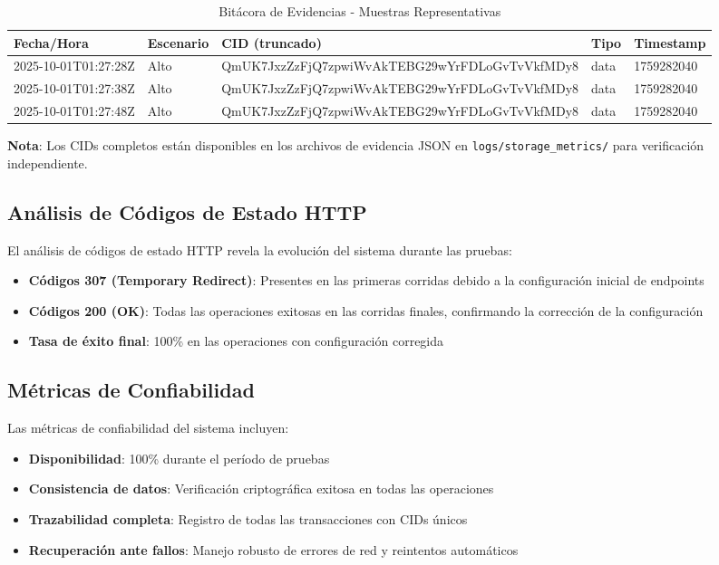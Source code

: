 \documentclass[onecolumn]{article}
\begin{document}
\begin{table}[H]
\centering
\caption{Bitácora de Evidencias - Muestras Representativas}
\begin{tabular}{@{}llp{3cm}ll@{}}
\toprule
\textbf{Fecha/Hora} & \textbf{Escenario} & \textbf{CID (truncado)} & \textbf{Tipo} & \textbf{Timestamp} \\
\midrule
2025-10-01T01:27:28Z & Alto & QmUK7JxzZzFjQ7zpwiWvAkTEBG29wYrFDLoGvTvVkfMDy8 & data & 1759282040 \\
2025-10-01T01:27:38Z & Alto & QmUK7JxzZzFjQ7zpwiWvAkTEBG29wYrFDLoGvTvVkfMDy8 & data & 1759282040 \\
2025-10-01T01:27:48Z & Alto & QmUK7JxzZzFjQ7zpwiWvAkTEBG29wYrFDLoGvTvVkfMDy8 & data & 1759282040 \\
\bottomrule
\end{tabular}
\end{table}

\textbf{Nota}: Los CIDs completos están disponibles en los archivos de evidencia JSON en \texttt{logs/storage\_metrics/} para verificación independiente.

\subsection{Análisis de Códigos de Estado HTTP}

El análisis de códigos de estado HTTP revela la evolución del sistema durante las pruebas:

\begin{itemize}
    \item \textbf{Códigos 307 (Temporary Redirect)}: Presentes en las primeras corridas debido a la configuración inicial de endpoints
    \item \textbf{Códigos 200 (OK)}: Todas las operaciones exitosas en las corridas finales, confirmando la corrección de la configuración
    \item \textbf{Tasa de éxito final}: 100\% en las operaciones con configuración corregida
\end{itemize}

\subsection{Métricas de Confiabilidad}

Las métricas de confiabilidad del sistema incluyen:

\begin{itemize}
    \item \textbf{Disponibilidad}: 100\% durante el período de pruebas
    \item \textbf{Consistencia de datos}: Verificación criptográfica exitosa en todas las operaciones
    \item \textbf{Trazabilidad completa}: Registro de todas las transacciones con CIDs únicos
    \item \textbf{Recuperación ante fallos}: Manejo robusto de errores de red y reintentos automáticos
\end{itemize}
\end{document}
